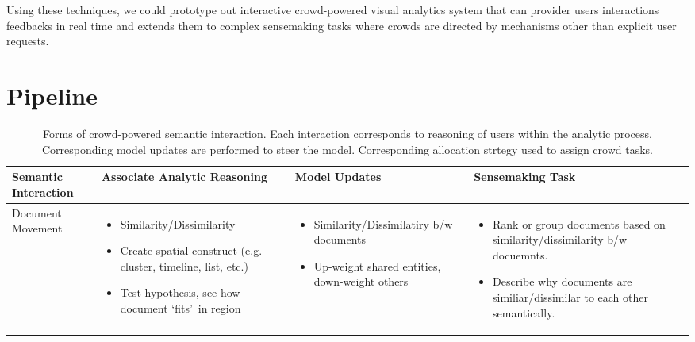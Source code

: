 \documentclass[journal]{vgtc}                %
\begin{document}
Using these techniques, we could prototype out interactive crowd-powered visual analytics system that can provider users interactions feedbacks in real time and extends them to complex sensemaking tasks where crowds are directed by mechanisms other than explicit user requests.

\section{Pipeline}


\begin{table}[t]
  \caption{Forms of crowd-powered semantic interaction. Each interaction corresponds to reasoning of users within the analytic process. Corresponding model updates are performed to steer the model. Corresponding allocation strtegy used to assign crowd tasks.}
  \label{tab:SensemakingTasks}
  \centering
  \begin{tabular}{| m{2.5cm} | m{4.5cm} | m{4.5cm} | m{4.5cm} |}
  \hline
   Semantic \newline Interaction & Associate Analytic Reasoning & Model Updates & Sensemaking Task \\ \hline

Document \newline Movement  & \begin{itemize} [leftmargin=.1in]
                                \item Similarity/Dissimilarity
                                \item Create spatial construct (e.g. cluster, timeline, list, etc.)
                                \item Test hypothesis, see how document \lq fits\rq \ in region
                              \end{itemize}
                            &
                               \begin{itemize}  [leftmargin=.1in]
                                 \item Similarity/Dissimilatiry b/w documents
                                 \item Up-weight shared entities, down-weight others
                               \end{itemize}
                            &  \begin{itemize} [leftmargin=.1in]
                                 \item Rank or group documents based on similarity/dissimilarity b/w docuemnts.
                                 \item Describe why documents are similiar/dissimilar to each other semantically.
                               \end{itemize} \\ \hline


\end{tabular}
\end{table}
\end{document}
